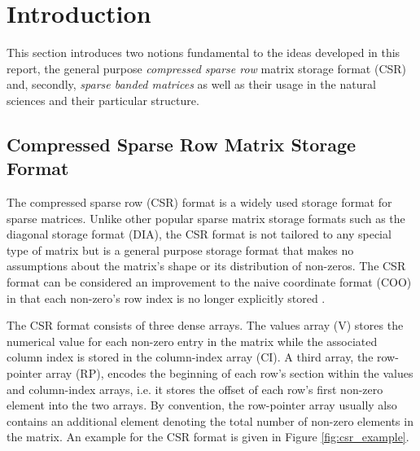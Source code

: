 \chapter{Introduction}

  This section introduces two notions fundamental to the ideas developed in this report, the general purpose
  \emph{compressed sparse row} matrix storage format (CSR) and, secondly, \emph{sparse banded matrices} as well as
  their usage in the natural sciences and their particular structure.

  \section{Compressed Sparse Row Matrix Storage Format}

    The compressed sparse row (CSR) format is a widely used storage format for sparse matrices. Unlike other popular
    sparse matrix storage formats such as the diagonal storage format (DIA), the CSR format is not tailored to any
    special type of matrix but is a general purpose storage format that makes no assumptions about the matrix's shape or
    its distribution of non-zeros. The CSR format can be considered an improvement to the naive coordinate format (COO)
    in that each non-zero's row index is no longer explicitly stored \cite{Bell2011}.

    The CSR format consists of three dense arrays. The values array (V) stores the numerical value for each non-zero
    entry in the matrix while the associated column index is stored in the column-index array (CI). A third array, the
    row-pointer array (RP), encodes the beginning of each row's section within the values and column-index arrays, i.e.
    it stores the offset of each row's first non-zero element into the two arrays. By convention, the row-pointer array
    usually also contains an additional element denoting the total number of non-zero elements in the matrix. An example
    for the CSR format is given in Figure \ref{fig:csr_example}.

